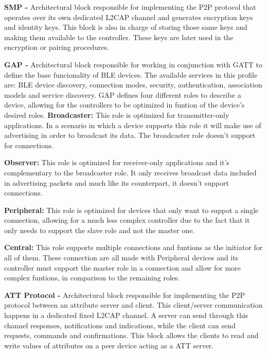 \textbf{\ac{SMP} -} Architectural block responsible for implementing the \ac{P2P} protocol that operates over its own dedicated \ac{L2CAP} channel and generates encryption keys and identity keys. This block is also in charge of storing those same keys and making them available to the controller. These keys are later used in the encryption or pairing procedures.


\textbf{\ac{GAP} -} Architectural block responsible for working in conjunction with \ac{GATT} to define the base funcionality of \ac{BLE} devices. The available services in this profile are: \ac{BLE} device discovery, connection modes, security, authentication, association models and service discovery.
\ac{GAP} defines four different roles to describe a device, allowing for the controllers to be optimized in funtion of the device's desired roles.
\tab \textbf{Broadcaster:} This role is optimized for transmitter-only applications. In a scenario in which a device supports this role it will make use of advertising in order to broadcast its data. The broadcaster role doesn't support for connections.
 
 
\tab \textbf{Observer:} This role is optimized for receiver-only applications and it's complementary to the broadcaster role. It only receives broadcast data included in advertising packets and much like its counterpart, it doesn't support connections.
 

\tab \textbf{Peripheral:} This role is optimized for devices that only want to suppot a single connection, allowing for a much less complex controller due to the fact that it only needs to support the slave role and not the master one.


\tab \textbf{Central:} This role supports multiple connections and funtions as the initiator for all of them. These connection are all made with Peripheral devices and its controller must support the master role in a connection and allow for more complex funtions, in comparison to the remaining roles.


\textbf{\ac{ATT} Protocol -} Architectural block responsible for implementing the \ac{P2P} protocol between an attribute server and client. This client/server communication happens in a dedicated fixed \ac{L2CAP} channel. A server can send through this channel responses, notifications and indications, while the client can send requests, commands and confirmations. This block allows the clients to read and write values of attributes on a peer device acting as a \ac{ATT} server.


